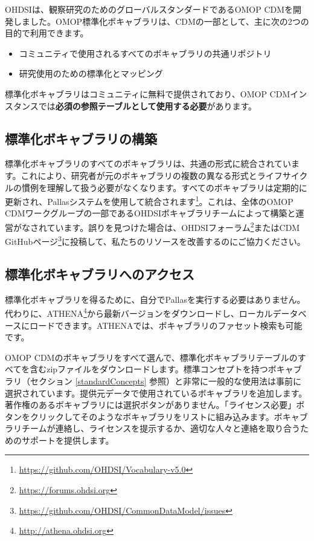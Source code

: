 \documentclass[
  11pt]{book}
\theoremstyle{definition}
\theoremstyle{definition}
\theoremstyle{definition}
\theoremstyle{definition}
\theoremstyle{remark}
\begin{document}
OHDSIは、観察研究のためのグローバルスタンダードであるOMOP CDMを開発しました。OMOP標準化ボキャブラリは、CDMの一部として、主に次の2つの目的で利用できます。

\begin{itemize}
\item
  コミュニティで使用されるすべてのボキャブラリの共通リポジトリ
\item
  研究使用のための標準化とマッピング
\end{itemize}

標準化ボキャブラリはコミュニティに無料で提供されており、OMOP CDMインスタンスでは\textbf{必須の参照テーブルとして使用する必要}があります。

\subsection{標準化ボキャブラリの構築}\label{ux6a19ux6e96ux5316ux30dcux30adux30e3ux30d6ux30e9ux30eaux306eux69cbux7bc9}

標準化ボキャブラリのすべてのボキャブラリは、共通の形式に統合されています。これにより、研究者が元のボキャブラリの複数の異なる形式とライフサイクルの慣例を理解して扱う必要がなくなります。すべてのボキャブラリは定期的に更新され、Pallasシステムを使用して統合されます\footnote{\url{https://github.com/OHDSI/Vocabulary-v5.0}}。これは、全体のOMOP CDMワークグループの一部であるOHDSIボキャブラリチームによって構築と運営がなされています。誤りを見つけた場合は、OHDSIフォーラム\footnote{\url{https://forums.ohdsi.org}}またはCDM GitHubページ\footnote{\url{https://github.com/OHDSI/CommonDataModel/issues}}に投稿して、私たちのリソースを改善するのにご協力ください。 

\subsection{標準化ボキャブラリへのアクセス}\label{accessVocabularies}

標準化ボキャブラリを得るために、自分でPallasを実行する必要はありません。代わりに、ATHENA\footnote{\url{http://athena.ohdsi.org}}から最新バージョンをダウンロードし、ローカルデータベースにロードできます。ATHENAでは、ボキャブラリのファセット検索も可能です。   

OMOP CDMのボキャブラリをすべて選んで、標準化ボキャブラリテーブルのすべてを含むzipファイルをダウンロードします。標準コンセプトを持つボキャブラリ（セクション \ref{standardConcepts} 参照）と非常に一般的な使用法は事前に選択されています。提供元データで使用されているボキャブラリを追加します。著作権のあるボキャブラリには選択ボタンがありません。「ライセンス必要」ボタンをクリックしてそのようなボキャブラリをリストに組み込みます。ボキャブラリチームが連絡し、ライセンスを提示するか、適切な人々と連絡を取り合うためのサポートを提供します。
\end{document}
